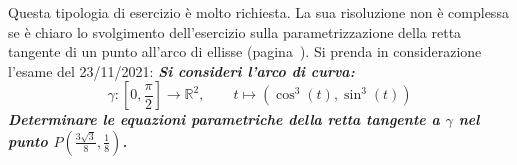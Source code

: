 \documentclass[a4paper]{article}
\begin{document}
	Questa tipologia di esercizio è molto richiesta. La sua risoluzione non è complessa se è chiaro lo svolgimento dell'esercizio sulla parametrizzazione della retta tangente di un punto all'arco di ellisse (pagina~\pageref{par: parametrizzazione retta tangente in un punto all'arco di ellisse}). Si prenda in considerazione l'esame del 23/11/2021: \textcolor{Green4}{\textbf{\emph{Si consideri l'arco di curva:}}
	\begin{equation*}
		\gamma : \left[0, \dfrac{\pi}{2}\right] \rightarrow \mathbb{R}^{2}, \hspace{2em} t \mapsto \left(\cos^{3}\left(t\right), \sin^{3}\left(t\right)\right)
	\end{equation*}
	\textbf{\emph{Determinare le equazioni parametriche della retta tangente a $\gamma$ nel punto $P\left(\frac{3\sqrt{3}}{8}, \frac{1}{8}\right)$.}}}\newline
\end{document}

